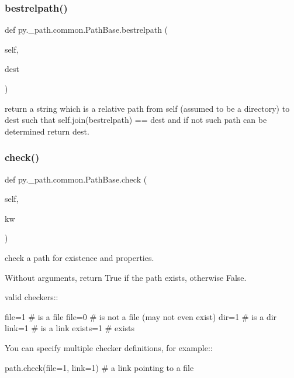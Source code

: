 \subsubsection{\texorpdfstring{bestrelpath()}{bestrelpath()}}
{\footnotesize\ttfamily def py.\+\_\+path.\+common.\+Path\+Base.\+bestrelpath (\begin{DoxyParamCaption}\item[{}]{self,  }\item[{}]{dest }\end{DoxyParamCaption})}

\begin{DoxyVerb}return a string which is a relative path from self
    (assumed to be a directory) to dest such that
    self.join(bestrelpath) == dest and if not such
    path can be determined return dest.
\end{DoxyVerb}
 \mbox{\label{classpy_1_1__path_1_1common_1_1_path_base_a6daedaef42f89446c07a1d9b0b5d52b6}} 
\subsubsection{\texorpdfstring{check()}{check()}}
{\footnotesize\ttfamily def py.\+\_\+path.\+common.\+Path\+Base.\+check (\begin{DoxyParamCaption}\item[{}]{self,  }\item[{}]{kw }\end{DoxyParamCaption})}

\begin{DoxyVerb}check a path for existence and properties.

    Without arguments, return True if the path exists, otherwise False.

    valid checkers::

file=1    # is a file
file=0    # is not a file (may not even exist)
dir=1     # is a dir
link=1    # is a link
exists=1  # exists

    You can specify multiple checker definitions, for example::

path.check(file=1, link=1)  # a link pointing to a file
\end{DoxyVerb}
 \mbox{\label{classpy_1_1__path_1_1common_1_1_path_base_a6120a4b3b7fab85bb59f60e50679b021}} 
